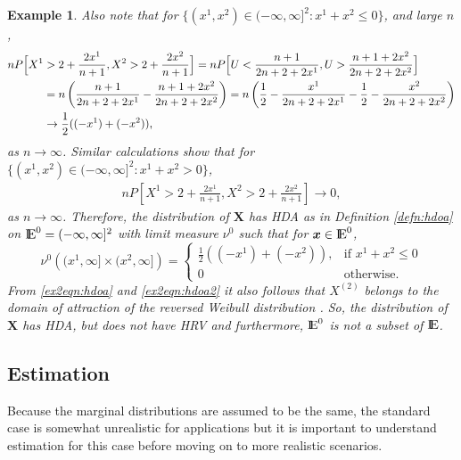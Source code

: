 \documentclass[11 pt]{amsart}
\newtheorem{ex}[thm]{Example}
\numberwithin{equation}{section}
\begin{document}
{\begin{ex}
{{Also note that for $\{ (x^1, x^2) \in (-\infty, \infty]^2: x^1 + x^2 \le 0\}$, and large $n$,
\begin{align}\label{ex2eqn:hdoa} 
nP\Bigl[ X^1 &> 2 + \frac{2x^1}{n+1}, X^2 >  2 + \frac{2x^2}{n+1}
\Bigr]  = nP\Bigl[ U < \frac{n+1}{2n + 2 + 2x^1}, U  >  \frac{n + 1 +
  2x^2}{2n+2 +2x^2} \Bigr] \nonumber \\ 
&= n \left(\frac{n+1}{2n + 2 + 2x^1} - \frac{n + 1 + 2x^2}{2n+2+ 2x^2} \right) 
= n \left( \frac{1}{2} - \frac{x^1}{2n + 2 + 2x^1} - \frac{1}{2} - \frac{x^2}{2n+2+2x^2} \right)\nonumber \\
& \rightarrow \frac{1}{2}( (-x^1) + (-x^2) ),
\end{align}
as $n \to \infty$. Similar calculations show that for $\{ (x^1, x^2) \in (-\infty, \infty]^2: x^1 + x^2 > 0\}$, 
\begin{align}\label{ex2eqn:hdoa2}
nP\left[ X^1 > 2 + \frac{2x^1}{n+1}, X^2 >  2 + \frac{2x^2}{n+1} \right] \rightarrow 0,
\end{align}
as $n \to \infty$. Therefore, the distribution of ${\boldsymbol X}$ has HDA as in Definition \ref{defn:hdoa} on ${\mathop{\rm I\kern -0.20em E}\nolimits}^0 = (-\infty, \infty]^2$ with limit measure $\nu^0$ such that for ${\boldsymbol x} \in {\mathop{\rm I\kern -0.20em E}\nolimits}^0$,
$$ \nu^0\left((x^1, \infty] \times (x^2, \infty] \right) = \left \{ \begin{array}{lr} \frac{1}{2}( (-x^1) + (-x^2) ), & \text{if }  x^1 + x^2 \le 0\\
0 & \text{otherwise.} \end{array} \right.$$
 From \eqref{ex2eqn:hdoa} and \eqref{ex2eqn:hdoa2} it also follows
 that $X^{(2)}$ belongs to the domain of attraction of the reversed
 Weibull distribution \cite[page 59]{resnickbook:2008}. So, the
 distribution of ${\boldsymbol X}$ has HDA, but does not have HRV and
 furthermore, ${\mathop{\rm I\kern -0.20em E}\nolimits}^0$ is not a subset of ${\mathop{\rm I\kern -0.20em E}\nolimits}$.
}}
\end{ex}

\subsection{Estimation}\label{sec:stanestimation}
Because the marginal distributions are assumed to be the same, the standard case is somewhat unrealistic for applications but it is
important to understand estimation for this case before moving on to 
more realistic scenarios.

}
\end{document}
